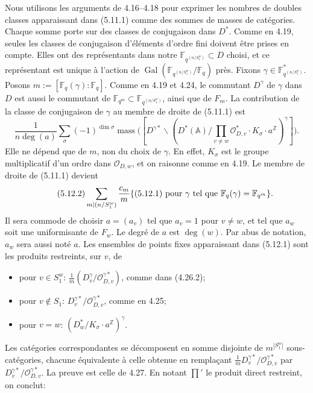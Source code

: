 \documentclass[10pt]{article}
\newcommand{\Fq}{\mathbb F_q}
\newcommand{\Fqm}{\mathbb F_{q^m}}
\newcommand{\Z}{\mathbb Z}
\newcommand{\Adele}{\mathbb A}
\newcommand{\Gal}{\operatorname{Gal}}
\newcommand{\degm}{\operatorname{deg}}
\newcommand{\mass}{\operatorname{mass}}
\theoremstyle{deligne}
\newcommand{\heading}[1]{\vspace{0.7em}\noindent{\bfseries #1}\quad}
\begin{document}
\heading{5.12.} Nous utilisons les arguments de 4.16--4.18 pour exprimer les nombres de doubles classes apparaissant dans (5.11.1) comme des sommes de masses de catégories. Chaque somme porte sur des classes de conjugaison dans $D^*$. Comme en 4.19, seules les classes de conjugaison d'éléments d'ordre fini doivent être prises en compte. Elles ont des représentants dans notre $\mathbb F_{q^{(n/S_1^w)}}\subset D$ choisi, et ce représentant est unique à l'action de $\Gal(\mathbb F_{q^{(n/S_1^w)}}/\Fq)$ près. Fixons $\gamma\in\mathbb F_{q^{(n/S_1^w)}}^*$. Posons $m:=[\Fq(\gamma):\Fq]$. Comme en 4.19 et 4.24, le commutant $D^\gamma$ de $\gamma$ dans $D$ est aussi le commutant de $\Fqm\subset\mathbb F_{q^{(n/S_1^w)}}$, ainsi que de $F_m$. La contribution de la classe de conjugaison de $\gamma$ au membre de droite de (5.11.1) est
\begin{equation}\tag{5.12.1}
\frac{1}{n\degm(a)}\sum_\sigma(-1)^{\dim\sigma}
\mass\bigl([D^{\gamma *}\backslash(D^*(\Adele)/\prod_{v\ne w}\mathcal O_{D,v}^*\cdot K_\sigma\cdot a^\Z)^\gamma]\bigr).
\end{equation}
Elle ne dépend que de $m$, non du choix de $\gamma$. En effet, $K_\sigma$ est le groupe multiplicatif d'un ordre dans $\mathcal O_{D,w}$, et on raisonne comme en 4.19. Le membre de droite de (5.11.1) devient
\begin{equation}\tag{5.12.2}
\sum_{m\mid(n/S_1^w)}\frac{c_m}{m}\{\hbox{(5.12.1) pour }\gamma\hbox{ tel que }\Fq(\gamma)=\Fqm\}.
\end{equation}
Il sera commode de choisir $a=(a_v)$ tel que $a_v=1$ pour $v\ne w$, et tel que $a_w$ soit une uniformisante de $F_w$. Le degré de $a$ est $\degm(w)$. Par abus de notation, $a_w$ sera aussi noté $a$. Les ensembles de points fixes apparaissant dans (5.12.1) sont les produits restreints, sur $v$, de
\begin{itemize}
\item pour $v\in S_1^w$: $\frac1m(D_v^\gamma/\mathcal O_{D,v}^{\gamma *})$, comme dans (4.26.2);
\item pour $v\notin S_1$: $D_v^{\gamma *}/\mathcal O_{D,v}^{\gamma *}$, comme en 4.25;
\item pour $v=w$: $(D_w^*/K_\sigma\cdot a^\Z)^\gamma$.
\end{itemize}
Les catégories correspondantes se décomposent en somme disjointe de $m^{|S_1^w|}$ sous-catégories, chacune équivalente à celle obtenue en remplaçant $\frac1mD_v^{\gamma *}/\mathcal O_{D,v}^{\gamma *}$ par $D_v^{\gamma *}/\mathcal O_{D,v}^{\gamma *}$. La preuve est celle de 4.27. En notant $\prod'$ le produit direct restreint, on conclut:
\end{document}
